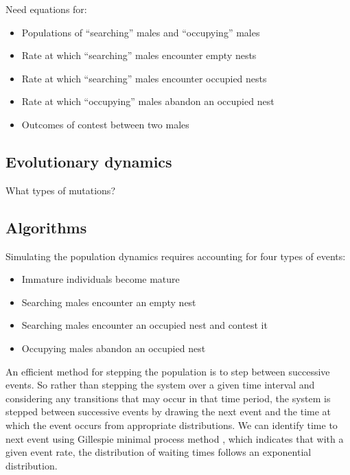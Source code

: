 \documentclass[a4paper,11pt]{article}
\begin{document}
Need equations for:
\begin{itemize}
    \item Populations of ``searching'' males and  ``occupying'' males
    \item Rate at which ``searching'' males encounter empty nests
    \item Rate at which ``searching'' males encounter occupied nests
    \item Rate at which ``occupying'' males abandon an occupied nest
    \item Outcomes of contest between two males
\end{itemize}

\subsection{Evolutionary dynamics}

What types of mutations?

\subsection{Algorithms}
Simulating the population dynamics requires accounting for four types of events:
\begin{itemize}
    \item Immature individuals become mature
    \item Searching males encounter an empty nest
    \item Searching males encounter an occupied nest and contest it
    \item Occupying males abandon an occupied nest
\end{itemize}

An efficient method for stepping the population is to step between successive events. So rather than stepping the system over a given time interval and considering any transitions that may occur in that time period, the system is stepped between successive events by drawing the next event and the time at which the event occurs from appropriate distributions.  We can identify time to next event using Gillespie minimal process method \citep{Gillespie-1976}, which indicates that with a given event rate, the distribution of waiting times follows an exponential distribution.
\end{document}

